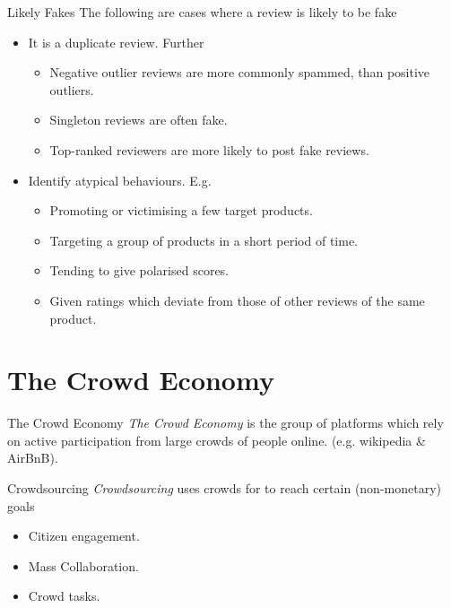 \documentclass[11pt,a4paper]{article}
\begin{document}
  \begin{proposition}{Likely Fakes}
    The following are cases where a review is likely to be fake
    \begin{itemize}
      \item It is a duplicate review. Further
      \begin{itemize}
        \item Negative outlier reviews are more commonly spammed, than positive outliers.
        \item Singleton reviews are often fake.
        \item Top-ranked reviewers are more likely to post fake reviews.
      \end{itemize}
      \item Identify atypical behaviours. E.g.
      \begin{itemize}
        \item Promoting or victimising a few target products.
        \item Targeting a group of products in a short period of time.
        \item Tending to give polarised scores.
        \item Given ratings which deviate from those of other reviews of the same product.
      \end{itemize}
    \end{itemize}
  \end{proposition}

\section{The Crowd Economy }

  \begin{definition}{The Crowd Economy}
    \textit{The Crowd Economy} is the group of platforms which rely on active participation from large crowds of people online. (e.g. wikipedia \& AirBnB).
  \end{definition}

  \begin{definition}{Crowdsourcing}
    \textit{Crowdsourcing} uses crowds for to reach certain (non-monetary) goals
    \begin{itemize}
      \item Citizen engagement.
      \item Mass Collaboration.
      \item Crowd tasks.
    \end{itemize}
  \end{definition}
\end{document}
